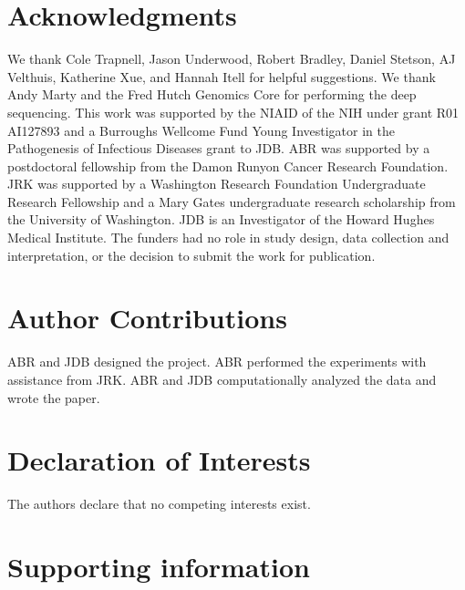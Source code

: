 \documentclass[10pt,letterpaper]{article}
\begin{document}
\section*{Acknowledgments}
We thank Cole Trapnell, Jason Underwood, Robert Bradley, Daniel Stetson, AJ Velthuis, Katherine Xue, and Hannah Itell for helpful suggestions.
We thank Andy Marty and the Fred Hutch Genomics Core for performing the deep sequencing.
This work was supported by the NIAID of the NIH under grant R01 AI127893 and a Burroughs Wellcome Fund Young Investigator in the Pathogenesis of Infectious Diseases grant to JDB.
ABR was supported by a postdoctoral fellowship from the Damon Runyon Cancer Research Foundation.
JRK was supported by a Washington Research Foundation Undergraduate Research Fellowship and a Mary Gates undergraduate research scholarship from the University of Washington.
JDB is an Investigator of the Howard Hughes Medical Institute.
The funders had no role in study design, data collection and interpretation, or the decision to submit the work for publication.

\section*{Author Contributions}
ABR and JDB designed the project.
ABR performed the experiments with assistance from JRK.
ABR and JDB computationally analyzed the data and wrote the paper.

\section*{Declaration of Interests}
The authors declare that no competing interests exist.



\clearpage
\section*{Supporting information}
\end{document}
